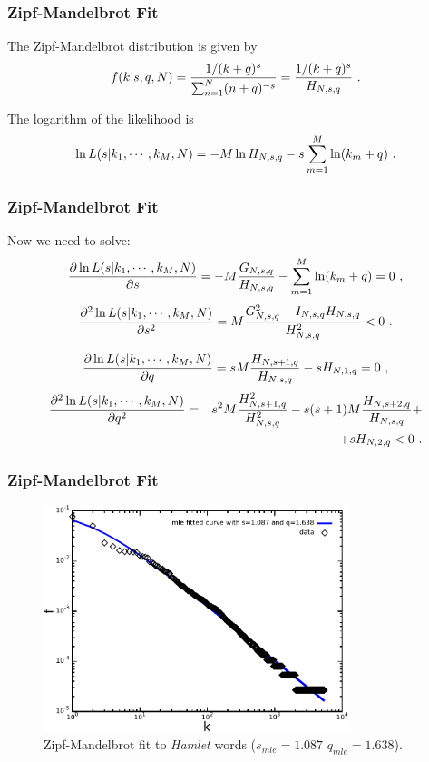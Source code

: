 \documentclass{beamer}
\begin{document}
\frame
{
  \frametitle{Zipf-Mandelbrot Fit}

The Zipf-Mandelbrot distribution is given by
\begin{equation}
f(k | s, q, N) = \frac{1/(k+q)^s}{\sum_{n=1}^{N} (n+q)^{-s} } = \frac{1/(k+q)^s}{H_{N,s,q}} \textmd{ .} 
\end{equation}

The logarithm of the likelihood is
\begin{equation}
\ln L(s|k_1,\cdots,k_M,N) = -M \ln H_{N,s,q} - s \sum_{m=1}^{M} \ln (k_m+q) \textmd{ .} 
\end{equation}
}


\frame
{
  \frametitle{Zipf-Mandelbrot Fit}
  Now we need to solve:
  \begin{equation}
  \frac{\partial \ln L(s|k_1,\cdots,k_M,N)}{\partial s} = -M \frac{G_{N,s,q}}{H_{N,s,q}} - \sum_{m=1}^{M} \ln (k_m + q) = 0 \textmd{ ,}
  \end{equation}
  \begin{equation}
  \frac{\partial^2 \ln L(s|k_1,\cdots,k_M,N)}{\partial s^2} = M \frac{G_{N,s,q}^2 - I_{N,s,q} H_{N,s,q}}{H_{N,s,q}^2} < 0  \textmd{ .}
  \end{equation}

  \begin{equation}
  \frac{\partial \ln L(s|k_1,\cdots,k_M,N)}{\partial q} = sM \frac{H_{N,s+1,q}}{H_{N,s,q}} - s H_{N,1,q} = 0 \textmd{ ,}
  \end{equation}
  \begin{eqnarray}
  \frac{\partial^2 \ln L(s|k_1,\cdots,k_M,N)}{\partial q^2} &=& s^2 M \frac{H_{N,s+1,q}^2}{H_{N,s,q}^2} - s(s+1)M \frac{H_{N,s+2,q}}{H_{N,s,q}} + \nonumber \\ && + s H_{N,2,q} < 0 \textmd{ .}
  \end{eqnarray}
}


\frame
{
  \frametitle{Zipf-Mandelbrot Fit}
  \vspace{-0.3cm}
  \begin{figure}[h]
  \centering
  \includegraphics[width=0.8\textwidth]{imagespresentation/shakespeare-hamlet.pdf}
  \caption{Zipf-Mandelbrot fit to \emph{Hamlet} words ($s_{mle}=1.087$ $q_{mle}=1.638$).}
  \end{figure}
}
\end{document}
